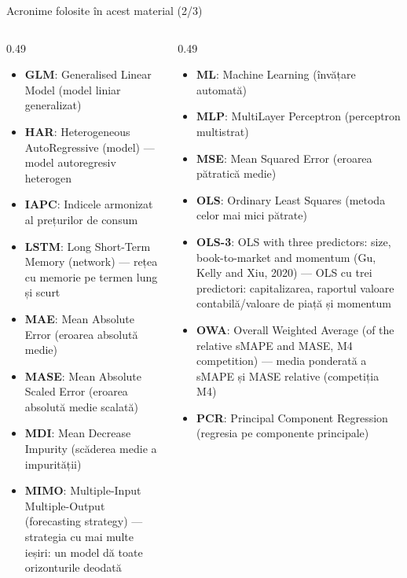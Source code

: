 \begin{frame}{Acronime folosite în acest material (2/3)}
\begin{columns}[T]
\begin{column}{0.49\textwidth}
\begin{itemize}\setlength{\itemsep}{0pt}
    \item \textbf{GLM}: Generalised Linear Model (model liniar generalizat)
    \item \textbf{HAR}: Heterogeneous AutoRegressive (model) — model autoregresiv heterogen
    \item \textbf{IAPC}: Indicele armonizat al prețurilor de consum
    \item \textbf{LSTM}: Long Short-Term Memory (network) — rețea cu memorie pe termen lung și scurt
    \item \textbf{MAE}: Mean Absolute Error (eroarea absolută medie)
    \item \textbf{MASE}: Mean Absolute Scaled Error (eroarea absolută medie scalată)
    \item \textbf{MDI}: Mean Decrease Impurity (scăderea medie a impurității)
    \item \textbf{MIMO}: Multiple-Input Multiple-Output (forecasting strategy) — strategia cu mai multe ieșiri: un model dă toate orizonturile deodată
\end{itemize}
\end{column}
\begin{column}{0.49\textwidth}
\begin{itemize}\setlength{\itemsep}{0pt}
    \item \textbf{ML}: Machine Learning (învățare automată)
    \item \textbf{MLP}: MultiLayer Perceptron (perceptron multistrat)
    \item \textbf{MSE}: Mean Squared Error (eroarea pătratică medie)
    \item \textbf{OLS}: Ordinary Least Squares (metoda celor mai mici pătrate)
    \item \textbf{OLS-3}: OLS with three predictors: size, book-to-market and momentum (Gu, Kelly and Xiu, 2020) — OLS cu trei predictori: capitalizarea, raportul valoare contabilă/valoare de piață și momentum
    \item \textbf{OWA}: Overall Weighted Average (of the relative sMAPE and MASE, M4 competition) — media ponderată a sMAPE și MASE relative (competiția M4)
    \item \textbf{PCR}: Principal Component Regression (regresia pe componente principale)
\end{itemize}
\end{column}
\end{columns}
\end{frame}
